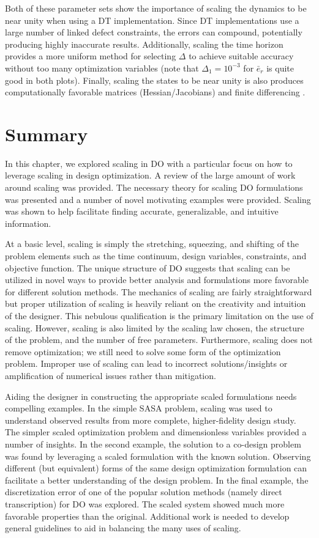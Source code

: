 Both of these parameter sets show the importance of scaling the dynamics to be near unity when using a DT implementation.
Since DT implementations use a large number of linked defect constraints, the errors can compound, potentially producing highly inaccurate results.
Additionally, scaling the time horizon provides a more uniform method for selecting $\Delta$ to achieve suitable accuracy without too many optimization variables (note that $\Delta_1=10^{-3}$ for $\bar{e}_r$ is quite good in both plots). Finally, scaling the states to be near unity is also produces computationally favorable matrices (Hessian/Jacobians) and finite differencing \cite{Rao2010a, Betts2010a}.

\section{Summary\label{sec:ch4:conclusion}}

In this chapter, we explored scaling in DO with a particular focus on how to leverage scaling in design optimization.
A review of the large amount of work around scaling was provided.
The necessary theory for scaling DO formulations was presented and a number of novel motivating examples were provided.
Scaling was shown to help facilitate finding accurate, generalizable, and intuitive information.

At a basic level, scaling is simply the stretching, squeezing, and shifting of the problem elements such as the time continuum, design variables, constraints, and objective function. 
The unique structure of DO suggests that scaling can be utilized in novel ways to provide better analysis and formulations more favorable for different solution methods.
The mechanics of scaling are fairly straightforward but proper utilization of scaling is heavily reliant on the creativity and intuition of the designer.
This nebulous qualification is the primary limitation on the use of scaling. However, scaling is also limited by the scaling law chosen, the structure of the problem, and the number of free parameters.
Furthermore, scaling does not remove optimization; we still need to solve some form of the optimization problem.
Improper use of scaling can lead to incorrect solutions/insights or amplification of numerical issues rather than mitigation.

Aiding the designer in constructing the appropriate scaled formulations needs compelling examples.
In the simple SASA problem, scaling was used to understand observed results from more complete, higher-fidelity design study. The simpler scaled optimization problem and dimensionless variables provided a number of insights. 
In the second example, the solution to a co-design problem was found by leveraging a scaled formulation with the known solution.
Observing different (but equivalent) forms of the same design optimization formulation can facilitate a better understanding of the design problem.
In the final example, the discretization error of one of the popular solution methods (namely direct transcription) for DO was explored. The scaled system showed much more favorable properties than the original.
Additional work is needed to develop general guidelines to aid in balancing the many uses of scaling.